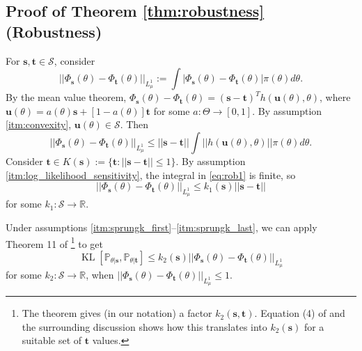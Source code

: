 \documentclass{article}
\theoremstyle{plain}
\theoremstyle{definition}
\theoremstyle{remark}
\DeclareMathOperator{\KL}{KL}
\begin{document}
\subsection{Proof of Theorem \ref{thm:robustness} (Robustness)} \label{sec:robustness_proof}

For $\mathbf{s}, \mathbf{t} \in \mathcal{S}$, consider
\[
||\Phi_{\mathbf{s}}(\theta) - \Phi_{\mathbf{t}}(\theta)||_{L^1_\mu}
:= \int |\Phi_\mathbf{s}(\theta) - \Phi_\mathbf{t}(\theta)| \pi(\theta) d\theta.
\]
By the mean value theorem, $\Phi_{\mathbf{s}}(\theta) - \Phi_{\mathbf{t}}(\theta) = (\mathbf{s}-\mathbf{t})^T h(\mathbf{u}(\theta), \theta)$,
where $\mathbf{u}(\theta) = a(\theta) \mathbf{s} + [1-a(\theta)] \mathbf{t}$
for some $a:\Theta \to [0,1]$.
By assumption \ref{itm:convexity}, $\mathbf{u}(\theta) \in\mathcal{S}$.
Then
\begin{equation} \label{eq:rob1}
||\Phi_{\mathbf{s}}(\theta) - \Phi_{\mathbf{t}}(\theta)||_{L^1_\mu}
\leq ||\mathbf{s}-\mathbf{t}||
\int || h(\mathbf{u}(\theta), \theta) || \pi(\theta) d\theta.
\end{equation}
Consider $\mathbf{t} \in K(\mathbf{s}) := \{ \mathbf{t} : ||\mathbf{s} - \mathbf{t}|| \leq 1 \}$.
By assumption \ref{itm:log_likelihood_sensitivity}, the integral in \eqref{eq:rob1} is finite, so
\begin{equation} \label{eq:rob2}
||\Phi_{\mathbf{s}}(\theta) - \Phi_{\mathbf{t}}(\theta)||_{L^1_\mu}
\leq k_1(\mathbf{s}) ||\mathbf{s}-\mathbf{t}||
\end{equation}
for some $k_1:\mathcal{S} \to \mathbb{R}$.

Under assumptions \ref{itm:sprungk_first}--\ref{itm:sprungk_last}, we can apply Theorem 11 of \citet{sprungkLocalLipschitzStability2020a}\footnote{
  The theorem gives (in our notation) a factor $k_2(\mathbf{s}, \mathbf{t})$.
  Equation (4) of \citet{sprungkLocalLipschitzStability2020a} and the surrounding discussion shows how this translates into $k_2(\mathbf{s})$ for a suitable set of $\mathbf{t}$ values.
} to get
\begin{equation} \label{eq:rob3}
\KL[
  \mathbb{P}_{\theta|\mathbf{s}},
  \mathbb{P}_{\theta|\mathbf{t}}
] \leq k_2(\mathbf{s})
||\Phi_{\mathbf{s}}(\theta) - \Phi_{\mathbf{t}}(\theta)||_{L^1_\mu}
\end{equation}
for some $k_2:\mathcal{S} \to \mathbb{R}$,
when $||\Phi_{\mathbf{s}}(\theta) - \Phi_{\mathbf{t}}(\theta)||_{L^1_\mu} \leq 1$.
\end{document}
